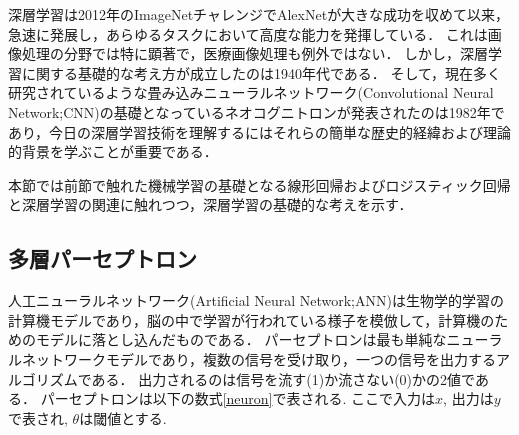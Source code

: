 深層学習は2012年のImageNetチャレンジ\cite{ILSVRC15}でAlexNet\cite{krizhevsky2012imagenet}が大きな成功を収めて以来，急速に発展し，あらゆるタスクにおいて高度な能力を発揮している\cite{alom2018history}．
これは画像処理の分野では特に顕著で，医療画像処理も例外ではない\cite{litjens2017survey}．
しかし，深層学習に関する基礎的な考え方が成立したのは1940年代である\cite{Goodfellow-et-al-2016}．
そして，現在多く研究されているような畳み込みニューラルネットワーク(Convolutional Neural Network;CNN)\cite{lecun1998gradient}の基礎となっているネオコグニトロン\cite{fukushima1982neocognitron}が発表されたのは1982年であり，今日の深層学習技術を理解するにはそれらの簡単な歴史的経緯および理論的背景を学ぶことが重要である．

本節では前節で触れた機械学習の基礎となる線形回帰およびロジスティック回帰と深層学習の関連に触れつつ，深層学習の基礎的な考えを示す．

\subsection{多層パーセプトロン}
    人工ニューラルネットワーク(Artificial Neural Network;ANN)は生物学的学習の計算機モデルであり，脳の中で学習が行われている様子を模倣して，計算機のためのモデルに落とし込んだものである．
    パーセプトロンは最も単純なニューラルネットワークモデルであり，複数の信号を受け取り，一つの信号を出力するアルゴリズムである．
    出力されるのは信号を流す(1)か流さない(0)かの2値である．
    パーセプトロンは以下の数式\ref{neuron}で表される.
    ここで入力は$x$, 出力は$y$で表され, $\theta$は閾値とする.

